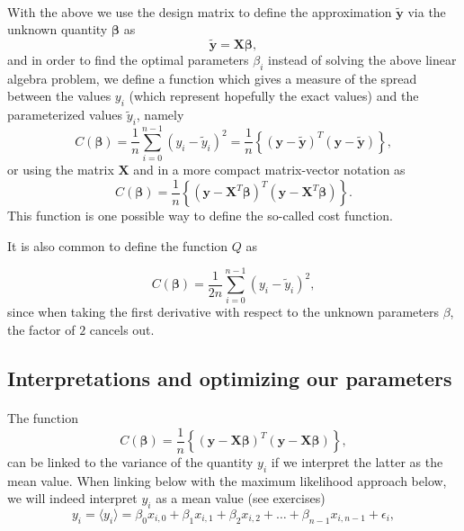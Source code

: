 \documentclass[%
oneside,                 %
final,                   %
10pt]{article}
\begin{document}
\paragraph{}
With the above we use the design matrix to define the approximation $\bm{\tilde{y}}$ via the unknown quantity $\bm{\beta}$ as
\[
\bm{\tilde{y}}= \bm{X}\bm{\beta},
\]
and in order to find the optimal parameters $\beta_i$ instead of solving the above linear algebra problem, we define a function which gives a measure of the spread between the values $y_i$ (which represent hopefully the exact values) and the parameterized values $\tilde{y}_i$, namely
\[
C(\bm{\beta})=\frac{1}{n}\sum_{i=0}^{n-1}\left(y_i-\tilde{y}_i\right)^2=\frac{1}{n}\left\{\left(\bm{y}-\bm{\tilde{y}}\right)^T\left(\bm{y}-\bm{\tilde{y}}\right)\right\},
\]
or using the matrix $\bm{X}$ and in a more compact matrix-vector notation as
\[
C(\bm{\beta})=\frac{1}{n}\left\{\left(\bm{y}-\bm{X}^T\bm{\beta}\right)^T\left(\bm{y}-\bm{X}^T\bm{\beta}\right)\right\}.
\]
This function is one possible way to define the so-called cost function.



It is also common to define
the function $Q$ as

\[
C(\bm{\beta})=\frac{1}{2n}\sum_{i=0}^{n-1}\left(y_i-\tilde{y}_i\right)^2,
\]
since when taking the first derivative with respect to the unknown parameters $\beta$, the factor of $2$ cancels out.




\subsection{Interpretations and optimizing our parameters}

\paragraph{}

The function 
\[
C(\bm{\beta})=\frac{1}{n}\left\{\left(\bm{y}-\bm{X}\bm{\beta}\right)^T\left(\bm{y}-\bm{X}\bm{\beta}\right)\right\},
\]
can be linked to the variance of the quantity $y_i$ if we interpret the latter as the mean value. 
When linking below with the maximum likelihood approach below, we will indeed interpret $y_i$ as a mean value (see exercises)
\[
y_{i}=\langle y_i \rangle = \beta_0x_{i,0}+\beta_1x_{i,1}+\beta_2x_{i,2}+\dots+\beta_{n-1}x_{i,n-1}+\epsilon_i,
\]
\end{document}
